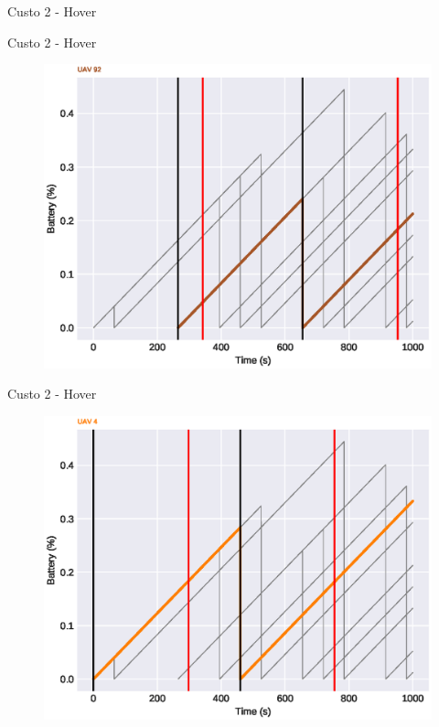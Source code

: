 \begin{frame}{Custo 2 - Hover}
\begin{figure}[!htb]
                 \end{figure}
            \end{frame}\begin{frame}{Custo 2 - Hover}
                \begin{figure}[!htb]
                     \includegraphics[width=\textwidth]{custo_2/uav_hover_acum_uav_6.eps}
                 \end{figure}
            \end{frame}\begin{frame}{Custo 2 - Hover}
                \begin{figure}[!htb]
                     \includegraphics[width=\textwidth]{custo_2/uav_hover_acum_uav_4.eps}

\end{figure}
\end{frame}
